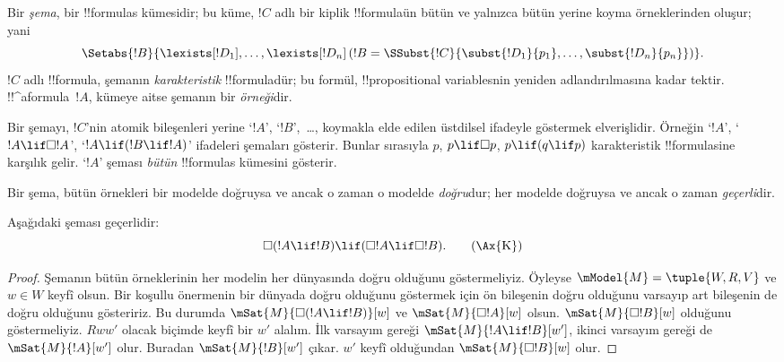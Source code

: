 



\begin{defn}
  Bir \emph{şema}, bir !!{formula}s kümesidir; bu küme, $!C$ adlı bir kiplik
  !!{formula}{}ün bütün ve yalnızca bütün yerine koyma örneklerinden oluşur;
  yani
  \[
  \Setabs{!B}{\lexists[!D_1], \dots, \lexists[!D_n] \left(!B =
  \SSubst{!C}{\subst{!D_1}{p_1}, \dots, \subst{!D_n}{p_n}} \right) }.
  \]
  $!C$ adlı !!{formula}, şemanın \emph{karakteristik} !!{formula}{}dür;
  bu formül, !!{propositional variable}s{}nin yeniden adlandırılmasına kadar
  tektir. !!^a{formula}~$!A$, kümeye aitse şemanın bir \emph{örneği}dir.
\end{defn}

Bir şemayı, $!C$'nin atomik bileşenleri yerine `$!A$', `$!B$',~\dots,
koymakla elde edilen üstdilsel ifadeyle göstermek elverişlidir. Örneğin
`$!A$', `$!A \lif \Box!A$', `$!A \lif (!B \lif !A)$' ifadeleri şemaları
gösterir. Bunlar sırasıyla $p$, $p \lif \Box p$, $p \lif (q \lif p)$
karakteristik !!{formula}s{}ine karşılık gelir. `$!A$' şeması \emph{bütün}
!!{formula}s kümesini gösterir.

\begin{defn}
  Bir şema, bütün örnekleri bir modelde doğruysa ve ancak o zaman o modelde
  \emph{doğru}dur; her modelde doğruysa ve ancak o zaman \emph{geçerli}dir.
\end{defn}

\begin{prop}
  Aşağıdaki  şeması geçerlidir:
  \begin{equation*}
  \Box(!A \lif !B) \lif (\Box !A \lif \Box !B). \tag{\Ax{K}}
  \end{equation*}
\end{prop}

\begin{proof}
  Şemanın bütün örneklerinin her modelin her dünyasında doğru olduğunu
  göstermeliyiz. Öyleyse $\mModel{M} = \tuple{W,R,V}$ ve $w \in W$ keyfî
  olsun. Bir koşullu önermenin bir dünyada doğru olduğunu göstermek için ön
  bileşenin doğru olduğunu varsayıp art bileşenin de doğru olduğunu
  gösteririz. Bu durumda $\mSat{M}{\Box(!A \lif !B)}[w]$ ve
  $\mSat{M}{\Box !A}[w]$ olsun. $\mSat{M}{\Box !B}[w]$ olduğunu
  göstermeliyiz. $Rww'$ olacak biçimde keyfî bir $w'$ alalım. İlk varsayım
  gereği $\mSat{M}{!A \lif !B}[w']$, ikinci varsayım gereği de
  $\mSat{M}{!A}[w']$ olur. Buradan $\mSat{M}{!B}[w']$ çıkar. $w'$ keyfî
  olduğundan $\mSat{M}{\Box !B}[w]$ olur.
\end{proof}

